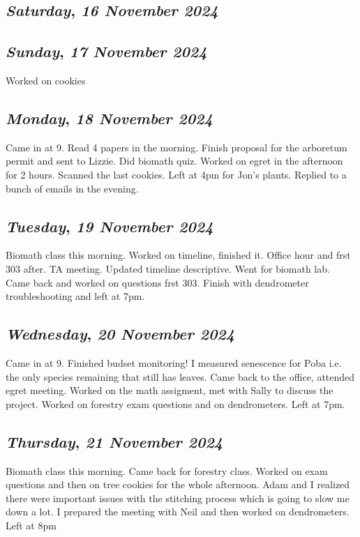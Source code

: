 \def\day{\textit{16 November 2024}}
\def\weekday{\textit{Saturday}}
\subsection*{\weekday, \day}

\def\day{\textit{17 November 2024}}
\def\weekday{\textit{Sunday}}
\subsection*{\weekday, \day}
Worked on cookies

\def\day{\textit{18 November 2024}}
\def\weekday{\textit{Monday}}
\subsection*{\weekday, \day}
Came in at 9. Read 4 papers in the morning. Finish proposal for the arboretum permit and sent to Lizzie. Did biomath quiz. Worked on egret in the afternoon for 2 hours. Scanned the last cookies. Left at 4pm for Jon's plants. Replied to  a bunch of emails in the evening.

\def\day{\textit{19 November 2024}}
\def\weekday{\textit{Tuesday}}
\subsection*{\weekday, \day}
Biomath class this morning. Worked on timeline, finished it. Office hour and frst 303 after. TA meeting. Updated timeline descriptive. Went for biomath lab. Came back and worked on questions frst 303. Finish with dendrometer troubleshooting and left at 7pm. 

\def\day{\textit{20 November 2024}}
\def\weekday{\textit{Wednesday}}
\subsection*{\weekday, \day}
Came in at 9. Finished budset monitoring! I measured senescence for Poba i.e. the only species remaining that still has leaves. Came back to the office, attended egret meeting. Worked on the math assigment, met with Sally to discuss the project. Worked on forestry exam questions and on dendrometers. Left at 7pm.

\def\day{\textit{21 November 2024}}
\def\weekday{\textit{Thursday}}
\subsection*{\weekday, \day}
Biomath class this morning. Came back for forestry class. Worked on exam questions and then on tree cookies for the whole afternoon. Adam and I realized there were important issues with the stitching process which is going to slow me down a lot. I prepared the meeting with Neil and then worked on dendrometers. Left at 8pm

